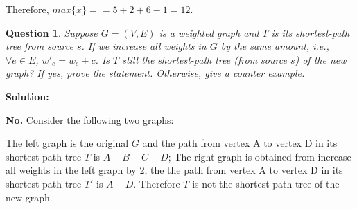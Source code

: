 \documentclass[10.5pt]{article}
\newtheorem{Q}{Question}
\begin{document}
Therefore, $max\{x\} == 5 + 2 + 6 - 1= 12$. 
\vspace{120pt}
\pagebreak
\begin{Q}
	Suppose $G = (V, E)$ is a weighted graph and $T$ is its shortest-path tree from source $s$. If we increase all weights in $G$ by the same amount, i.e., $\forall e \in E$, $w'_e = w_e + c$. Is $T$ still the shortest-path tree (from source $s$) of the new graph? If yes, prove the statement. Otherwise, give a counter example.
\end{Q}
\par\textbf{Solution:}
\par\textbf{No.} Consider the following two graphs:
\begin{figure}[htbp]
		\centering
		\hspace{0.8in}
		
\end{figure}
\par The left graph is the original $G$ and the path from vertex A to vertex D in its shortest-path tree $T$ is $A - B - C - D$; The right graph is obtained from increase all weights in the left graph by 2, the the path from vertex A to vertex D in its shortest-path tree $T'$ is $A - D$. Therefore $T$ is not the shortest-path tree of the new graph.
	
\end{document}
